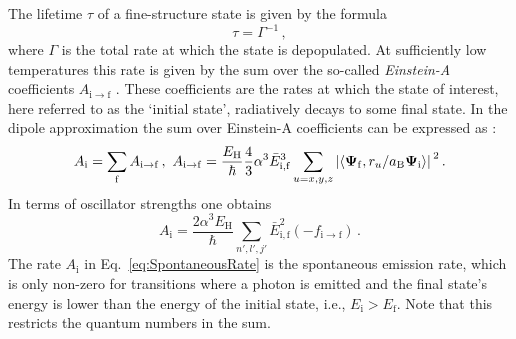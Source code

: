 \documentclass[fontsize=12pt,
               twoside=false,
               BCOR=0mm,
               DIV=14,
               overfullrule=false, %
               toc=bibliography,
               headinclude=true,
               footinclude=false]{scrartcl}
\numberwithin{equation}{section}
\newcommand{\aB}{a_\mathrm{B}}
\newcommand{\EH}{E_\mathrm{H}}
\begin{document}
    The lifetime $\tau$ of a fine-structure state is given by the formula
    \begin{equation}
        \tau = \Gamma^{-1}
    \,,
    \end{equation}
    where $\Gamma$ is the total rate at which the state is depopulated. At
    sufficiently low temperatures this rate is given by the sum over the
    so-called \emph{Einstein-A} coefficients $A_\mathrm{i\to{f}}$
    \cite{einstein1917,friedrich2017}. These coefficients are the rates at which
    the state of interest, here referred to as the `initial state', radiatively
    decays to some final state. In the dipole approximation the sum over
    Einstein-A coefficients can be expressed as \cite{friedrich2017}:
    \begin{equation}\label{eq:DecayRateGeneralForm}
        A_\mathrm{i}
        =
        \sum_\mathrm{f}
        A_{\mathrm{i}\to\mathrm{f}}
    \,, \
        A_{\mathrm{i}\to\mathrm{f}}
        =
        \frac{\EH}{\hbar} \frac{4}{3} \alpha^3 \bar{E}^3_\mathrm{i,f}
        \sum_{u=x,y,z}
        \abs*{
            \langle\bm{\Psi}_\mathrm{f},r_u\slash\aB\bm{\Psi}_\mathrm{i}\rangle
        }^2
    \,.
    \end{equation}
    In terms of oscillator strengths one obtains
    \begin{equation}\label{eq:SpontaneousRate}
        A_\mathrm{i}
        =
        \frac{2\alpha^3\EH}{\hbar}
        \sum_{n',l',j'}
        \bar{E}^2_\mathrm{i,f} (-f_{\mathrm{i}\to\mathrm{f}})
    \,.
    \end{equation}
    The rate $A_\mathrm{i}$ in Eq.~\eqref{eq:SpontaneousRate} is the spontaneous
    emission rate, which is only non-zero for transitions where a photon is
    emitted and the final state's energy is lower than the energy of the initial
    state, i.e., $E_\mathrm{i}>E_\mathrm{f}$. Note that this restricts the
    quantum numbers in the sum.
\end{document}
